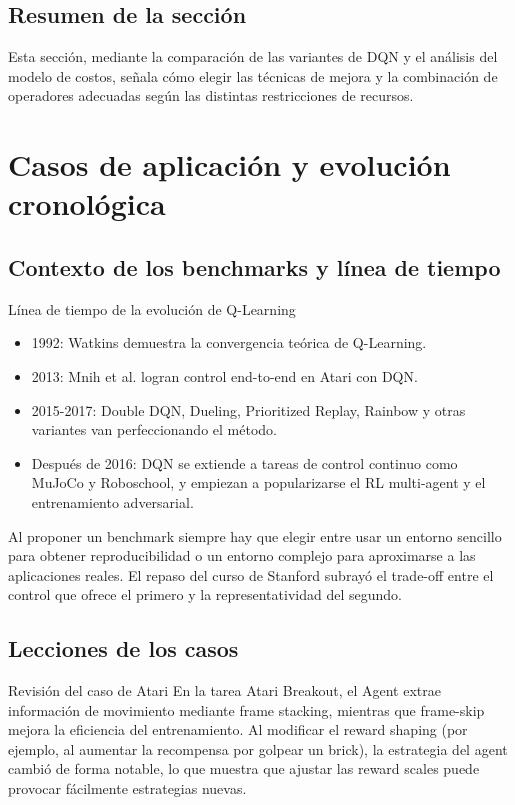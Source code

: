 \documentclass[a4paper]{article}
\begin{document}
\subsection{Resumen de la sección}

Esta sección, mediante la comparación de las variantes de DQN y el análisis del modelo de costos, señala cómo elegir las técnicas de mejora y la combinación de operadores adecuadas según las distintas restricciones de recursos.
\section{Casos de aplicación y evolución cronológica}

\subsection{Contexto de los benchmarks y línea de tiempo}

\begin{knowledgebox}{Línea de tiempo de la evolución de Q-Learning}
\begin{itemize}
    \item 1992: Watkins demuestra la convergencia teórica de Q-Learning.
    \item 2013: Mnih et al. logran control end-to-end en Atari con DQN.
    \item 2015-2017: Double DQN, Dueling, Prioritized Replay, Rainbow y otras variantes van perfeccionando el método.
    \item Después de 2016: DQN se extiende a tareas de control continuo como MuJoCo y Roboschool, y empiezan a popularizarse el RL multi-agent y el entrenamiento adversarial.
\end{itemize}
\end{knowledgebox}

Al proponer un benchmark siempre hay que elegir entre usar un entorno sencillo para obtener reproducibilidad o un entorno complejo para aproximarse a las aplicaciones reales. El repaso del curso de Stanford subrayó el trade-off entre el control que ofrece el primero y la representatividad del segundo.

\subsection{Lecciones de los casos}

\begin{importantbox}{Revisión del caso de Atari}
En la tarea Atari Breakout, el Agent extrae información de movimiento mediante frame stacking, mientras que frame-skip mejora la eficiencia del entrenamiento. Al modificar el reward shaping (por ejemplo, al aumentar la recompensa por golpear un brick), la estrategia del agent cambió de forma notable, lo que muestra que ajustar las reward scales puede provocar fácilmente estrategias nuevas.
\end{importantbox}
\end{document}
